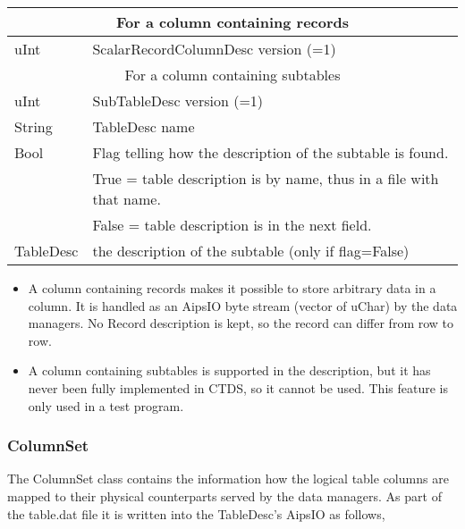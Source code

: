 \begin{tabular}{|l|p{13cm}|}
  \hline
  \multicolumn{2}{|c|}{For a column containing records} \\
  \hline
  uInt & ScalarRecordColumnDesc version (=1) \\
  \hline
  \multicolumn{2}{|c|}{For a column containing subtables} \\
  \hline
  uInt & SubTableDesc version (=1) \\
  String & TableDesc name \\
  Bool & Flag telling how the description of the subtable is found.
  \tabularnewline & True = table description is by name, thus in a
  file with that name.
  \tabularnewline & False = table description is in the next field. \\
  TableDesc & the description of the subtable (only if flag=False) \\
  \hline
\end{tabular}
\vspace{0.15in}

\begin{itemize}
\item A column containing records makes it possible to store arbitrary
  data in a column. It is handled as an AipsIO byte stream (vector of
  uChar) by the data managers. No Record description is kept, so the
  record can differ from row to row.
\item A column containing subtables is supported in the description, but it
  has never been fully implemented in CTDS, so it cannot be used. This
  feature is only used in a test program.
\end{itemize}

\subsubsection{\label{CTDS:COLUMNSET}ColumnSet}
The ColumnSet class contains the information how the logical table
columns are mapped to their physical counterparts served by the data
managers.
As part of the table.dat file it is written into the TableDesc's AipsIO as follows,

